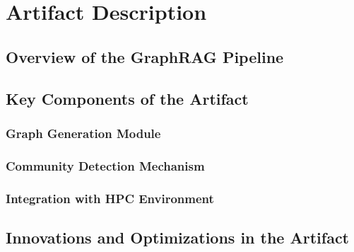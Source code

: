 \section{Artifact Description}
\subsection{Overview of the GraphRAG Pipeline}
\subsection{Key Components of the Artifact}
\subsubsection{Graph Generation Module}
\subsubsection{Community Detection Mechanism}
\subsubsection{Integration with HPC Environment}
\subsection{Innovations and Optimizations in the Artifact}